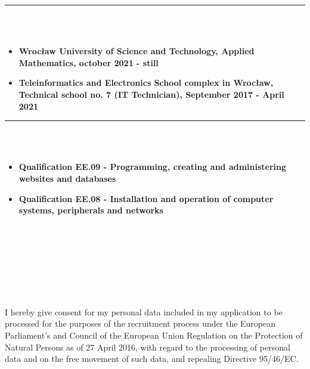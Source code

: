 \documentclass[10pt]{article}
\begin{document}
\begin{minipage}[t]{0.60\textwidth}
        \rule{11cm}{1pt} \\ \\
        \fontsize{10pt}{10pt}
        \begin{itemize}[leftmargin=*]
            \setlength{\parskip}{0pt}
            \item \textbf{Wrocław University of Science and Technology, Applied Mathematics, october 2021 - still}
            \item \textbf{Teleinformatics and Electronics School complex in Wrocław, \\ Technical school no. 7 (IT Technician), September 2017 - April 2021} 
        \end{itemize}
        \rule{11cm}{1pt} \\ \\
        \fontsize{10pt}{10pt}
        \begin{itemize}[leftmargin=*]
            \setlength{\parskip}{0pt}
            \item \textbf{Qualification EE.09 - Programming, creating and administering \\ websites and databases}
            \item \textbf{Qualification EE.08 - Installation and operation of computer systems, peripherals and networks}
        \end{itemize}
        \rule{0pt}{0pt} \\ \\ \\ \\ \\ \\ \\ 
        \fontsize{7pt}{5pt}\selectfont  
        I hereby give consent for my personal data included in my application to be processed for 
        the purposes of the recruitment process under the European Parliament's and Council of the 
        European Union Regulation on the Protection of Natural Persons as of 27 April 2016, with 
        regard to the processing of personal data and on the free movement of such data, and repealing 
        Directive 95/46/EC.
    \end{minipage}
\end{document}
